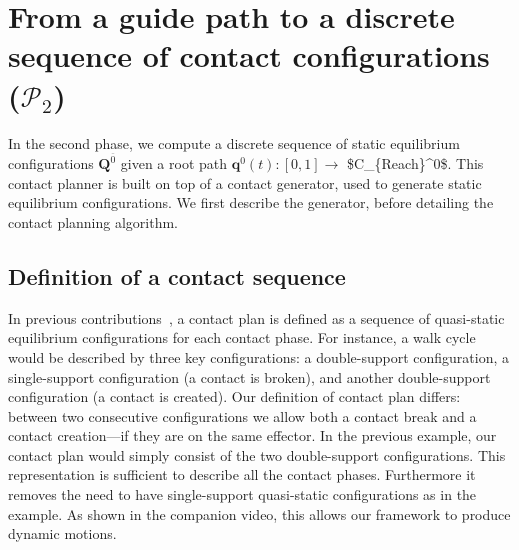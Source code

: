 \section{From a guide path to a discrete sequence of contact configurations ($\mathcal{P}_2$)}
\label{sec:contact}
In the second phase, we compute a discrete sequence of static equilibrium configurations $\mathbf{Q}^{\overline{0}}$ given a root path
$\mathbf{q}^0(t) : [0,1] \longrightarrow$ \gls{$C_{Reach}^0$}. This contact planner is built on top of
a contact generator, used to generate static equilibrium configurations. We first describe the generator, before detailing the contact planning algorithm.




\subsection{Definition of a contact sequence}
In previous contributions~\citep{DBLP:conf/iser/EscandeKMG08}, a contact plan is defined as a sequence of quasi-static equilibrium configurations
for each contact phase. For instance, a walk cycle would be described by three key configurations: a double-support configuration, a single-support configuration (a contact is broken), and another double-support configuration (a contact is created). 
Our definition of contact plan differs: between two consecutive configurations we allow both a contact break and a contact creation---if they are on the same effector. 
In the previous example, our contact plan would simply consist of the two double-support configurations. 
This representation is sufficient to describe all the contact phases. Furthermore it removes the need to have single-support quasi-static configurations as in the example. 
As shown in the companion video, this allows our framework to produce dynamic motions. 

